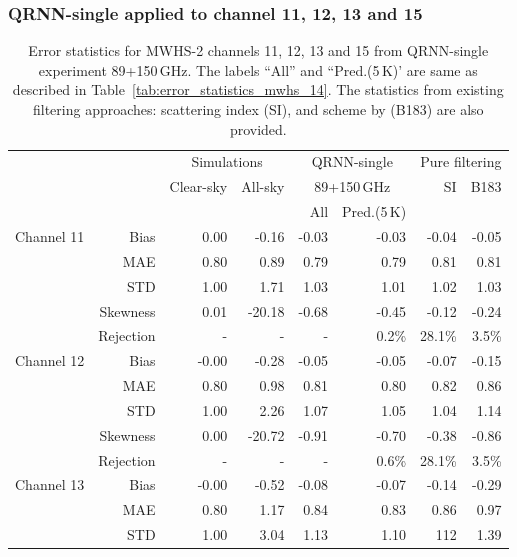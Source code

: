 \documentclass[amt, manuscript]{copernicus}
\begin{document}
\subsubsection{QRNN-single applied to channel 11, 12, 13 and 15}
\label{sec:mwhs_others}
\begin{table}[t]
	\caption{ Error statistics for MWHS-2 channels 11, 12, 13 and 15 from QRNN-single experiment 89+150\,GHz. The labels ``All'' and ``Pred.(5\,K)' are same as described in Table~\ref{tab:error_statistics_mwhs_14}. The statistics from existing filtering approaches: scattering index (SI), and scheme by \citet{buehler:aclou:07} (B183) are also provided.}
	\label{tab:error_statistics_mwhs_others}
	\begin{tabular}{lrrr|rr|rr}
		\tophline
		&&\multicolumn{2}{c|}{Simulations}& \multicolumn{2}{c|}{QRNN-single} & \multicolumn{2}{c}{Pure filtering} \\
		\cline{2-8}
		& &  Clear-sky &   All-sky &  \multicolumn{2}{c|}{89+150\,GHz}    & SI & B183  \\
		&	&		   &			& All & Pred.(5\,K) &&\\
		\middlehline
		Channel 11  &   Bias      & 0.00 &  -0.16 & -0.03 & -0.03		 &-0.04	& -0.05 \\
				    &	MAE       & 0.80 &   0.89 &  0.79 &  0.79  		 & 0.81	&  0.81 \\
					&	STD       & 1.00 &   1.71 &  1.03 &  1.01 		 & 1.02	&  1.03 \\
					&	Skewness  & 0.01 & -20.18 & -0.68 & -0.45 		 &-0.12 & -0.24 \\
					& Rejection   & -    & -      & -	  & 0.2\%        & 28.1\% & 3.5\%  \\
		\middlehline
		Channel 12  & Bias      & -0.00 &  -0.28 & -0.05 & -0.05		&  -0.07 & -0.15 \\
					& MAE       &  0.80 &   0.98 &  0.81 &  0.80  		&   0.82 &	0.86 \\
					& STD       &  1.00 &   2.26 &  1.07 &  1.05  		&  1.04  &  1.14 \\
					& Skewness  &  0.00 & -20.72 & -0.91 & -0.70  		&  -0.38 & -0.86 \\
					& Rejection & -    & -      & -	  & 0.6\%        & 28.1\% & 3.5\%  \\
		\middlehline
		Channel 13  & Bias      & -0.00 &  -0.52 & -0.08 & -0.07 		& -0.14  & -0.29 \\
					& MAE       &  0.80 &   1.17 &  0.84 &  0.83  		&  0.86  &  0.97 \\
					& STD       &  1.00 &   3.04 &  1.13 &  1.10  		&  112  &	1.39 \\

\end{tabular}
\end{table}
\end{document}
